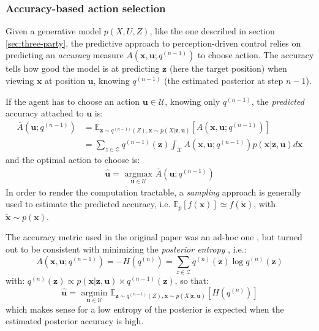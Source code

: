 \documentclass[12pt,twoside,openright]{article}
\begin{document}
\subsubsection{Accuracy-based action selection}\label{sec:infomax}

Given a generative model $p(X,U,Z)$, like the one described in section \ref{sec:three-party}, the predictive approach to perception-driven control \citep{najemnik2005optimal} relies on predicting an \emph{accuracy} measure $A(\boldsymbol{x}, \boldsymbol{u}; q^{(n-1)})$ to choose action. 
The accuracy tells how good the model is at predicting $\boldsymbol{z}$ (here the target position) when viewing $\boldsymbol{x}$ at position $\boldsymbol{u}$,
knowing $q^{(n-1)}$ (the estimated posterior at step $n-1$).

If the agent has to choose an action $\boldsymbol{u} \in \mathcal{U}$, knowing only $q^{(n-1)}$, the \emph{predicted} accuracy attached to $\boldsymbol{u}$ is:
\begin{align*}
\bar{A}(\boldsymbol{u}; q^{(n-1)})
&= \mathbb{E}_{\boldsymbol{z} \sim q^{(n-1)}(Z), \boldsymbol{x} \sim p(X|\boldsymbol{z}, \boldsymbol{u})}\left[A(\boldsymbol{x}, \boldsymbol{u}; q^{(n-1)})\right]  \\
&= \sum_{z\in\mathcal{Z}} q^{(n-1)}(\boldsymbol{z}) \int_{\mathcal{X}}  A(\boldsymbol{x}, \boldsymbol{u}; q^{(n-1)}) p(\boldsymbol{x}|\boldsymbol{z}, \boldsymbol{u}) d\boldsymbol{x}  
\end{align*}
and the optimal action to choose is:
\begin{align}
\hat{\boldsymbol{u}} = \underset{\boldsymbol{u} \in \mathcal{U}}{\text{ argmax }} \bar{A}(\boldsymbol{u}; q^{(n-1)})\label{eq:predictive-policy}
\end{align} 
In order to render the computation tractable, a \emph{sampling} approach is generally used to estimate the predicted accuracy, i.e. $\mathbb{E}_p[f(\boldsymbol{x})] \simeq f(\tilde{\boldsymbol{x}})$, with $\tilde{\boldsymbol{x}}\sim p(\boldsymbol{x})$.

The accuracy metric used in the original paper was an ad-hoc one \citep{najemnik2005optimal}, but turned out to be consistent with minimizing the \emph{posterior entropy} \citep{najemnik2009simple}, i.e.:
$$A(\boldsymbol{x}, \boldsymbol{u}; q^{(n-1)}) = -H(q^{(n)}) = \sum_{z \in \mathcal{Z}} q^{(n)}(\boldsymbol{z}) \log q^{(n)}(\boldsymbol{z})$$
with: $q^{(n)}(\boldsymbol{z}) \propto p(\boldsymbol{x|\boldsymbol{z}, \boldsymbol{u}}) \times q^{(n-1)}(\boldsymbol{z}) $,
so that:
$$\hat{\boldsymbol{u}} = \underset{\boldsymbol{u} \in \mathcal{U}}{\text{ argmin }} \mathbb{E}_{\boldsymbol{z} \sim q^{(n-1)}(Z), \boldsymbol{x} \sim p(X|\boldsymbol{z}, \boldsymbol{u})}\left[H(q^{(n)})\right] $$ 
which makes sense for a low entropy of the posterior is expected when the estimated posterior accuracy is high.
\end{document}
